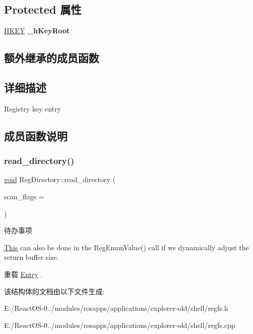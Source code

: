 \subsection*{Protected 属性}
\begin{DoxyCompactItemize}
\item 
\mbox{\label{struct_reg_directory_a00f15e624ca00c32596c5c329d048006}} 
\hyperlink{interfacevoid}{H\+K\+EY} {\bfseries \+\_\+h\+Key\+Root}
\end{DoxyCompactItemize}
\subsection*{额外继承的成员函数}


\subsection{详细描述}
Registry key entry 

\subsection{成员函数说明}
\mbox{\label{struct_reg_directory_a48c2c8255423b0bcaca17bbb2fda20b0}} 
\subsubsection{\texorpdfstring{read\+\_\+directory()}{read\_directory()}}
{\footnotesize\ttfamily \hyperlink{interfacevoid}{void} Reg\+Directory\+::read\+\_\+directory (\begin{DoxyParamCaption}\item[{int}]{scan\+\_\+flags = {} }\end{DoxyParamCaption})\hspace{0.3cm}{\ttfamily [virtual]}}

\begin{DoxyRefDesc}{待办事项}
\item[\hyperlink{todo__todo000043}{待办事项}]\hyperlink{namespace_this}{This} can also be done in the Reg\+Enum\+Value() call if we dynamically adjust the return buffer size. \end{DoxyRefDesc}


重载 \hyperlink{struct_entry}{Entry} .



该结构体的文档由以下文件生成\+:\begin{DoxyCompactItemize}
\item 
E\+:/\+React\+O\+S-\/0../modules/rosapps/applications/explorer-\/old/shell/regfs.\+h\item 
E\+:/\+React\+O\+S-\/0../modules/rosapps/applications/explorer-\/old/shell/regfs.\+cpp\end{DoxyCompactItemize}
